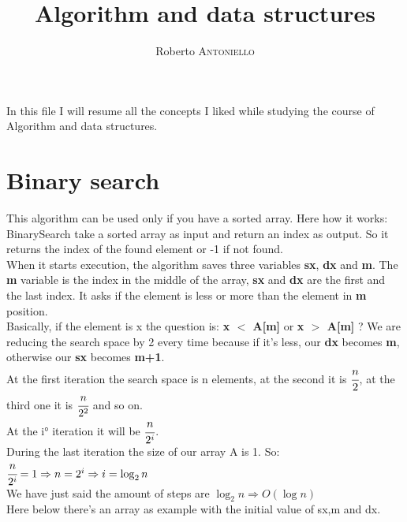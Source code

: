 \documentclass{article}
\title{Algorithm and data structures} %
\author{Roberto \textsc{Antoniello}} %
\begin{document}
\maketitle %

\begin{center} In this file I will resume all the concepts I liked while studying the course of Algorithm and data structures.\end{center}

\section{Binary search}
This algorithm can be used only if you have a sorted array. Here how it works: \\
BinarySearch take a sorted array as input and return an index as output. So it returns the index of the found element or -1 if not found.\\
When it starts execution, the algorithm saves three variables \textbf{sx}, \textbf{dx} and \textbf{m}. The \textbf{m} variable is the index in the middle of the array, \textbf{sx} and \textbf{dx} are the first and the last index. It asks if the element is less or more than the element in \textbf{m} position. \\
Basically, if the element is x the question is: 
\textbf{x $<$ A[m]}  or  \textbf{x $>$ A[m]} ? 
We are reducing the search space by 2 every time because if it's less, our \textbf{dx} becomes \textbf{m}, otherwise our \textbf{sx} becomes \textbf{m+1}. \\
At the first iteration the search space is n elements, at the second it is $\cfrac{n}{2}$, at the third one it is $\cfrac{n}{2^2}$ and so on.\\
At the i° iteration it will be $\cfrac{n}{2^i}$.\\
During the last iteration the size of our array A is 1. So:\\
$\cfrac{n}{2^i} = 1 \Rightarrow n = 2^i \Rightarrow i = \log_2{n}$ \\
We have just said the amount of steps are $\log_2{n} \Rightarrow O(\log{n})$ \\
Here below there's an array as example with the initial value of sx,m and dx. \\

\end{document}
